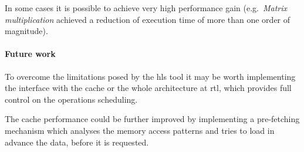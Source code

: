 \documentclass[11pt,a4paper,oneside]{memoir}
\begin{document}
In some cases it is possible to achieve very high performance gain (e.g.\
\emph{Matrix multiplication} achieved a reduction of execution time of more
than one order of magnitude).

\paragraph{Future work}
To overcome the limitations posed by the \ac{hls} tool it may be worth
implementing the interface with the cache or the whole architecture at
\ac{rtl}, which provides full control on the operations scheduling.

The cache performance could be further improved by implementing a pre-fetching
mechanism which analyses the memory access patterns and tries to load in advance
the data, before it is requested.

\backmatter

\printbibliography
\end{document}
